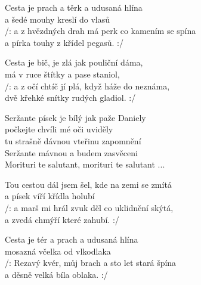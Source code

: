 
\ve
Cesta je prach a těrk a udusaná hlína\\
a šedé mouhy kreslí do vlasů\\
/: a z hvězdných drah má perk co kamením se spína\\
a pírka touhy z křídel pegasů. :/

\ve
Cesta je bič, je zlá jak pouliční dáma,\\
má v ruce štítky a pase staniol,\\
/: a z očí chtíč jí plá, když háže do neznáma,\\
dvě křehké snítky rudých gladiol. :/

\cho
{}Seržante písek je bílý jak paže Daniely\\
počkejte chvíli mé oči uviděly\\
tu strašně dávnou vteřinu zapomnění\\
Seržante mávnou a budem zasvěceni\\
Morituri te salutant, morituri te salutant ...


\ve
Tou cestou dál jsem šel, kde na zemi se zmítá\\
a písek víří křídla holubí\\
/: a marš mi hrál zvuk děl co uklidnění skýtá,\\
a zvedá chmýří které zahubí. :/

\ve
Cesta je tér a prach a udusaná hlína\\
mosazná včelka od vlkodlaka\\
/: Rezavý kvér, můj brach a sto let stará špína\\
a děsně velká bíla oblaka. :/

\cho

\esong{}